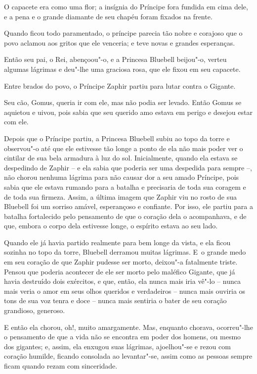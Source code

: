 O capacete era como uma flor; a insígnia do Príncipe fora fundida em
cima dele, e a pena e o grande diamante de seu chapéu foram fixados na
frente.

Quando ficou todo paramentado, o príncipe parecia tão nobre e corajoso
que o povo aclamou aos gritos que ele venceria; e teve novas e grandes
esperanças.

Então seu pai, o Rei, abençoou"-o, e a Princesa Bluebell beijou"-o, verteu
algumas lágrimas e deu"-lhe uma graciosa rosa, que ele fixou em seu
capacete.

Entre brados do povo, o Príncipe Zaphir partiu para lutar contra o
Gigante.

Seu cão, Gomus, queria ir com ele, mas não podia ser levado. Então Gomus
se aquietou e uivou, pois sabia que seu querido amo estava em perigo e
desejou estar com ele.

Depois que o Príncipe partiu, a Princesa Bluebell subiu ao topo da torre
e observou"-o até que ele estivesse tão longe a ponto de ela não mais
poder ver o cintilar de sua bela armadura à luz do sol. Inicialmente,
quando ela estava se despedindo de Zaphir -- e ela sabia que poderia ser
uma despedida para sempre --, não chorou nenhuma lágrima para não causar
dor a seu amado Príncipe, pois sabia que ele estava rumando para a
batalha e precisaria de toda sua coragem e de toda sua firmeza. Assim, a
última imagem que Zaphir viu no rosto de sua Bluebell foi um sorriso
amável, esperançoso e confiante. Por isso, ele partiu para a batalha
fortalecido pelo pensamento de que o coração dela o acompanhava, e de
que, embora o corpo dela estivesse longe, o espírito estava ao seu lado.

Quando ele já havia partido realmente para bem longe da vista, e ela
ficou sozinha no topo da torre, Bluebell derramou muitas lágrimas.
E~o grande medo em seu coração de que Zaphir pudesse ser morto, deixou"-a
fatalmente triste. Pensou que poderia acontecer de ele ser morto pelo
maléfico Gigante, que já havia destruído dois exércitos, e que, então,
ela nunca mais iria vê"-lo -- nunca mais veria o amor em seus olhos
queridos e verdadeiros -- nunca mais ouviria os tons de sua voz tenra e
doce -- nunca mais sentiria o bater de seu coração grandioso, generoso.

E então ela chorou, oh!, muito amargamente. Mas, enquanto chorava,
ocorreu"-lhe o pensamento de que a vida não se encontra em poder dos
homens, ou mesmo dos gigantes; e, assim, ela enxugou suas lágrimas,
ajoelhou"-se e rezou com coração humilde, ficando consolada ao
levantar"-se, assim como as pessoas sempre ficam quando rezam com
sinceridade.

